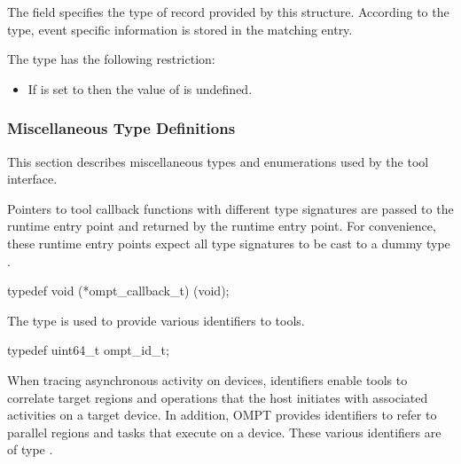 \descr
The field  specifies the type of record provided by this structure.
According to the type, event specific information is stored in the matching
 entry.

\restrictions
The  type has the following restriction:

\begin{itemize}
\item If  is set to  then
      the value of  is undefined.
\end{itemize}



\subsubsection{Miscellaneous Type Definitions}
\label{sec:ompt-types:misc}
This section describes miscellaneous types and enumerations used by the tool interface.



\label{sec:ompt_callback_t}

\summary
Pointers to tool callback functions with different type signatures are 
passed to the  runtime entry point and returned 
by the  runtime entry point. For convenience,
these runtime entry points expect all type signatures to be cast to
a dummy type .

\format
\begin{ccppspecific}
\begin{omptCallback}
typedef void (*ompt_callback_t) (void);
\end{omptCallback}
\end{ccppspecific}



\label{sec:ompt_id_t}

\summary
The  type is used to provide various identifiers to tools.

\format
\begin{ccppspecific}
\begin{omptOther}
typedef uint64_t ompt_id_t;
\end{omptOther}
\end{ccppspecific}

\descr
When tracing asynchronous activity on devices, identifiers  enable tools
to correlate target regions and operations that the host initiates with
associated activities on a target device. In addition, OMPT provides 
identifiers to refer to parallel regions and tasks that execute on a device.
These various identifiers are of type .

